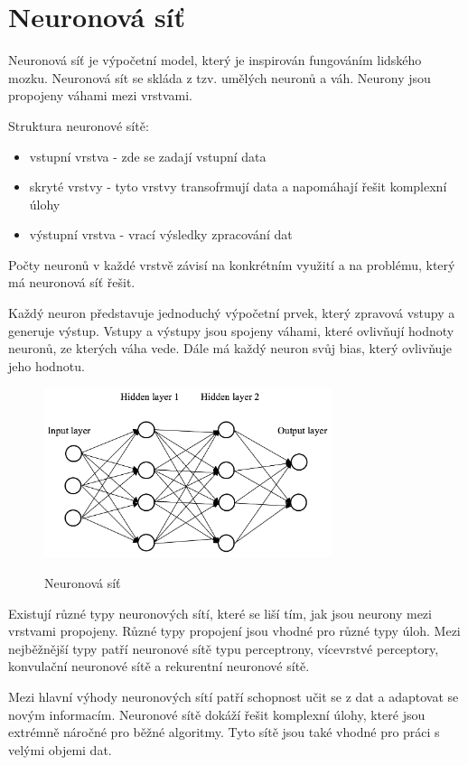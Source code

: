 \section{Neuronová síť}
Neuronová síť je výpočetní model, který je inspirován fungováním lidského mozku.
Neuronová sít se skláda z tzv. umělých neuronů a váh.
Neurony jsou propojeny váhami mezi vrstvami.

Struktura neuronové sítě:
\begin{itemize}
    \item vstupní vrstva - zde se zadají vstupní data
    \item skryté vrstvy - tyto vrstvy transofrmují data a napomáhají řešit komplexní úlohy
    \item výstupní vrstva - vrací výsledky zpracování dat
\end{itemize}

Počty neuronů v každé vrstvě závisí na konkrétním využití a na problému, který má neuronová síť řešit.

Každý neuron představuje jednoduchý výpočetní prvek, který zpravová vstupy a generuje výstup.
Vstupy a výstupy jsou spojeny váhami, které ovlivňují hodnoty neuronů, ze kterých váha vede.
Dále má každý neuron svůj bias, který ovlivňuje jeho hodnotu.

\begin{figure}[h]
    \centering
    \includegraphics[width=0.75\textwidth]{images/network.png}
    \caption{Neuronová síť}\cite{sit}
\end{figure}

Existují různé typy neuronových sítí, které se liší tím, jak jsou neurony mezi vrstvami propojeny.
Různé typy propojení jsou vhodné pro různé typy úloh.
Mezi nejběžnější typy patří neuronové sítě typu perceptrony, vícevrstvé perceptory, konvulační neuronové sítě a rekurentní neuronové sítě.

Mezi hlavní výhody neuronových sítí patří schopnost učit se z dat a adaptovat se novým informacím.
Neuronové sítě dokáží řešit komplexní úlohy, které jsou extrémně náročné pro běžné algoritmy.
Tyto sítě jsou také vhodné pro práci s velými objemi dat.

